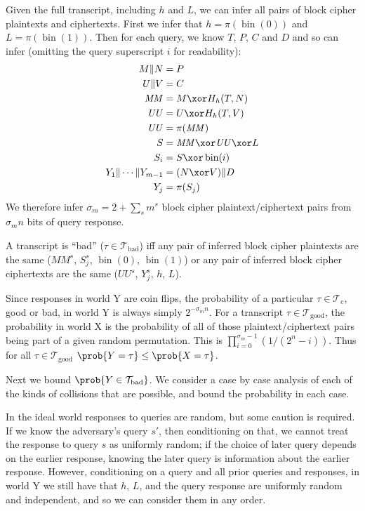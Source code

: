 \documentclass[letterpaper,11pt]{article}
\newcommand*{\Concat}{\Vert}
\newcommand*{\MM}{\mathit{MM}}
\newcommand*{\Tb}{\mathcal{T}_\mathrm{bad}}
\newcommand*{\Tc}{\mathcal{T}_\mathrm{c}}
\newcommand*{\Tg}{\mathcal{T}_\mathrm{good}}
\newcommand*{\UU}{\mathit{UU}}
\DeclareMathOperator{\fromint}{bin}
\begin{document}
Given the full transcript, including \(h\) and \(L\),
we can infer all pairs of block cipher plaintexts and ciphertexts.
First we infer that \(h = \pi(\fromint(0))\) and \(L = \pi(\fromint(1))\).
Then for each query, we know \(T\), \(P\), \(C\) and \(D\)
and so can infer
(omitting the query superscript \(i\) for readability):
\begin{align*}
    M \Concat N &= P \\
    U \Concat V &= C \\
    \MM &= M \xor H_h(T, N)\\
    \UU &= U \xor H_h(T, V)\\
    \UU &= \pi(\MM)\\
    S &= \MM \xor \UU \xor L\\ 
    S_i &= S \xor \fromint(i)\\
    Y_1 \Concat \cdots \Concat Y_{m-1} &= (N \xor V) \Concat D \\
    Y_j &= \pi(S_j) \\
\end{align*}
We therefore infer \(\sigma_m = 2 + \sum_s m^s \) block cipher
plaintext/ciphertext pairs from \(\sigma_m n\) bits of query response.

A transcript is ``bad'' (\(\tau \in \Tb\)) iff any pair of 
inferred block cipher plaintexts are the same
(\(\MM^s\), \(S_j^s\), \(\fromint(0)\), \(\fromint(1)\))
or any pair of inferred block cipher ciphertexts are the same
(\(\UU^s\), \(Y_j^s\), \(h\), \(L\)).

Since responses in world Y are coin flips,
the probability of a 
particular \(\tau \in \Tc\), good or bad,
in world Y is always simply \(2^{-\sigma_m n}\).
For a transcript \(\tau \in \Tg\),
the probability in world X
is the probability of all of those plaintext/ciphertext
pairs being part of a given random permutation.
This is 
\(\prod_{i=0}^{\sigma_m -1}(1/(2^n - i))\).
Thus for all \(\tau \in \Tg\)
\(\prob{Y = \tau} \leq \prob{X = \tau}\). 

Next we bound \(\prob{Y \in \Tb}\).
We consider a case by case analysis of
each of the kinds of collisions that are
possible, and bound the probability in each case.

In the ideal world responses to queries are random,
but some caution is required.
If we know the adversary's query \(s'\), then conditioning on that,
we cannot treat the response to query \(s\) as uniformly random;
if the choice of later query depends on the earlier response,
knowing the later query is information about the earlier response.
However, conditioning on a query and all prior queries and responses,
in world Y we still have that \(h\), \(L\), and the
query response are uniformly random and independent,
and so we can consider them in any order.
\end{document}
